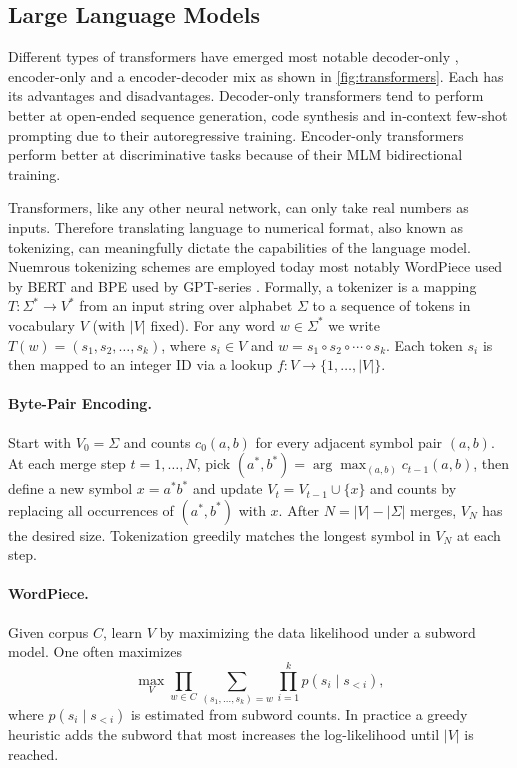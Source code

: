 \subsection{Large Language Models} 
\label{sec:llms}

Different types of transformers have emerged most notable decoder-only \cite{GPT32020}, encoder-only \cite{BERTGPT2023} and a encoder-decoder mix \cite{BART2019} as shown in \cref{fig:transformers}. Each has its advantages and disadvantages. Decoder-only transformers tend to perform better at open‑ended sequence generation, code synthesis and in‑context few‑shot prompting due to their autoregressive training. Encoder-only transformers perform better at discriminative tasks because of their \ac{MLM} bidirectional training.

Transformers, like any other neural network, can only take real numbers as inputs. Therefore translating language to numerical format, also known as tokenizing, can meaningfully dictate the capabilities of the language model. Nuemrous tokenizing schemes are employed today most notably WordPiece used by \ac{BERT} \cite{WORDPIECE2021} and \ac{BPE} used by \ac{GPT}-series \cite{BPE2024}. Formally, a tokenizer is a mapping $T:\Sigma^*\to V^*$ from an input string over alphabet $\Sigma$ to a sequence of tokens in vocabulary $V$ (with $|V|$ fixed). For any word $w\in\Sigma^*$ we write  
$T(w)=(s_1,s_2,\dots,s_k)$, where $s_i\in V$ and $w=s_1\circ s_2\circ\cdots\circ s_k$. Each token $s_i$ is then mapped to an integer ID via a lookup $f:V\to\{1,\dots,|V|\}$.

\paragraph{Byte-Pair Encoding.} Start with $V_0=\Sigma$ and counts $c_0(a,b)$ for every adjacent symbol pair $(a,b)$. At each merge step $t=1,\dots,N$, pick $(a^*,b^*)=\arg\max_{(a,b)}c_{t-1}(a,b)$,  
then define a new symbol $x=a^*b^*$ and update $V_t=V_{t-1}\cup\{x\}$ and counts by replacing all occurrences of $(a^*,b^*)$ with $x$. After $N=|V|-|\Sigma|$ merges, $V_N$ has the desired size. Tokenization greedily matches the longest symbol in $V_N$ at each step.

\paragraph{WordPiece.} Given corpus $C$, learn $V$ by maximizing the data likelihood under a subword model. One often maximizes  
\begin{equation*}
\max_V\prod_{w\in C}\sum_{(s_1,\dots,s_k)=w}\prod_{i=1}^k p(s_i\mid s_{<i}),
\end{equation*}
where $p(s_i\mid s_{<i})$ is estimated from subword counts. In practice a greedy heuristic adds the subword that most increases the log-likelihood until $|V|$ is reached.

